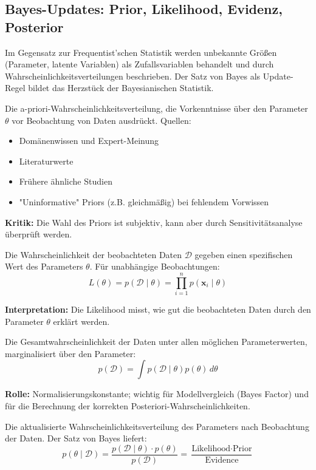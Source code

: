 \newpage

\subsection{Bayes-Updates: Prior, Likelihood, Evidenz, Posterior}

Im Gegensatz zur Frequentist'schen Statistik werden unbekannte Größen (Parameter, latente Variablen) als Zufallsvariablen behandelt und durch Wahrscheinlichkeitsverteilungen beschrieben. Der Satz von Bayes als Update-Regel bildet das Herzstück der Bayesianischen Statistik.

Die a-priori-Wahrscheinlichkeitsverteilung, die Vorkenntnisse über den Parameter $\theta$ vor Beobachtung von Daten ausdrückt. Quellen:
\begin{itemize}[leftmargin=1.5em]
    \item Domänenwissen und Expert-Meinung
    \item Literaturwerte
    \item Frühere ähnliche Studien
    \item "Uninformative" Priors (z.B. gleichmäßig) bei fehlendem Vorwissen
\end{itemize}

\textbf{Kritik:} Die Wahl des Priors ist subjektiv, kann aber durch Sensitivitätsanalyse überprüft werden.

Die Wahrscheinlichkeit der beobachteten Daten $\mathcal{D}$ gegeben einen spezifischen Wert des Parameters $\theta$. Für unabhängige Beobachtungen:
$$L(\theta) = p(\mathcal{D} \mid \theta) = \prod_{i=1}^{n} p(\mathbf{x}_i \mid \theta)$$

\textbf{Interpretation:} Die Likelihood misst, wie gut die beobachteten Daten durch den Parameter $\theta$ erklärt werden.

Die Gesamtwahrscheinlichkeit der Daten unter allen möglichen Parameterwerten, marginalisiert über den Parameter:
$$p(\mathcal{D}) = \int p(\mathcal{D} \mid \theta) p(\theta) \, d\theta$$

\textbf{Rolle:} Normalisierungskonstante; wichtig für Modellvergleich (Bayes Factor) und für die Berechnung der korrekten Posteriori-Wahrscheinlichkeiten.

Die aktualisierte Wahrscheinlichkeitsverteilung des Parameters nach Beobachtung der Daten. Der Satz von Bayes liefert:
$$p(\theta \mid \mathcal{D}) = \frac{p(\mathcal{D} \mid \theta) \cdot p(\theta)}{p(\mathcal{D})} = \frac{\text{Likelihood} \cdot \text{Prior}}{\text{Evidence}}$$

